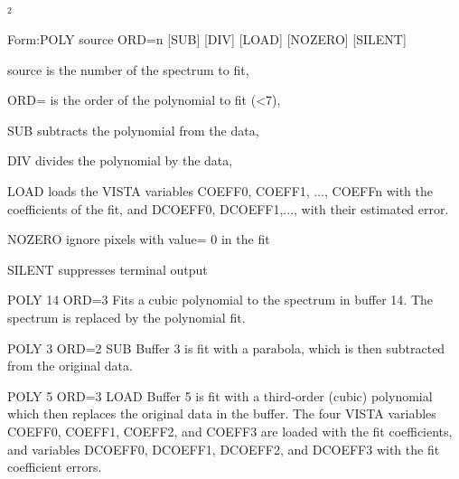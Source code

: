{\newpage\clearpage
{}%
$^2$%
\lthtmlinlinemathZ
\lthtmlcheckvsize\clearpage}

{\newpage\clearpage
{}%
\begin{command}
  \item[Form:POLY source ORD=n {[SUB]} {[DIV]} {[LOAD]} {[NOZERO]} 
       {[SILENT]}\hfill]{}
  \item[source]{is the number of the spectrum to fit,}
  \item[ORD=]{is the order of the polynomial to fit (<7),}
  \item[SUB]{subtracts the polynomial from the data,}
  \item[DIV]{divides the polynomial by the data,}
  \item[LOAD]{loads the VISTA variables COEFF0, COEFF1, ...,
       COEFFn with the coefficients of the fit, and
       DCOEFF0, DCOEFF1,..., with their estimated error.}
  \item[NOZERO]{ignore pixels with value= 0 in the fit}
  \item[SILENT]{suppresses terminal output}
\end{command}%
\lthtmlfigureZ
\lthtmlcheckvsize\clearpage}

{\newpage\clearpage
{}%
\begin{example}
  \item[POLY 14 ORD=3]{Fits a cubic polynomial to the spectrum in buffer
       14.  The spectrum is replaced by the polynomial fit.}
\par
\item[POLY 3 ORD=2 SUB]{Buffer 3 is fit with a parabola, which is then
       subtracted from the original data.}
\par
\item[POLY 5 ORD=3 LOAD]{Buffer 5 is fit with a third-order (cubic)
       polynomial which then replaces the original data in the buffer.  The
       four VISTA variables COEFF0, COEFF1, COEFF2, and COEFF3 are loaded
       with the fit coefficients, and variables DCOEFF0, DCOEFF1, DCOEFF2,
       and DCOEFF3 with the fit coefficient errors.}
\end{example}%
\lthtmlfigureZ
\lthtmlcheckvsize\clearpage}

